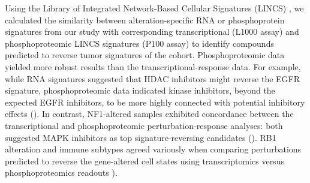 Using the Library of Integrated Network-Based Cellular Signatures (LINCS) \cite{keenanab_pillaia:LibraryIntegrated2018,stathiasv_schurersc:LINCSData2019}, we calculated the similarity between alteration-specific RNA or phosphoprotein signatures from our study with corresponding transcriptional (L1000 assay) \cite{subramaniana_golubtr:NextGeneration2017} and phosphoproteomic LINCS signatures (P100 assay) \cite{litichevskiyl_jaffejd:LibraryPhosphoproteomic2018} to identify compounds predicted to reverse tumor signatures of the cohort. Phosphoproteomic data yielded more robust results than the transcriptional-response data. For example, while RNA signatures suggested that HDAC inhibitors might reverse the EGFR signature, phosphoproteomic data indicated kinase inhibitors, beyond the expected EGFR inhibitors, to be more highly connected with potential inhibitory effects (). In contrast, NF1-altered samples exhibited concordance between the transcriptional and phosphoproteomic perturbation-response analyses: both suggested MAPK inhibitors as top signature-reversing candidates (). RB1 alteration and immune subtypes agreed variously when comparing perturbations predicted to reverse the gene-altered cell states using transcriptomics versus phosphoproteomics readouts ).

